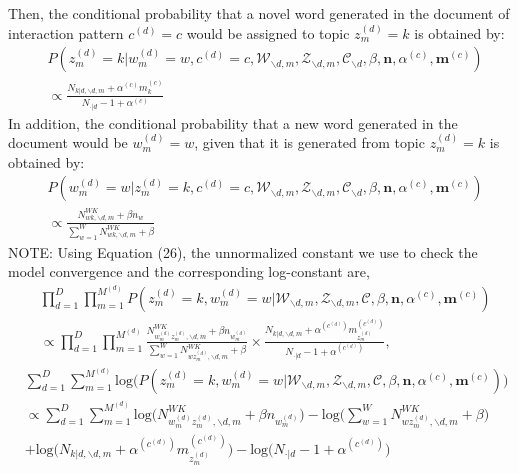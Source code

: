 \documentclass[a4paper]{article}
\begin{document}
  Then, the conditional probability that a novel word generated in the document of interaction pattern $c^{(d)}=c$  would be assigned to topic $z_m^{(d)}=k$ is obtained by:
  \begin{equation}
  \begin{aligned}
  &P(z^{(d)}_m=k|w^{(d)}_m=w, c^{(d)}=c, \mathcal{W}_{\backslash d, m}, \mathcal{Z}_{\backslash d,m}, \mathcal{C}_{\backslash d}, \beta, \boldsymbol{n}, \alpha^{(c)}, \boldsymbol{m}^{(c)}) \\& \propto
  \frac{N_{k|d, \backslash d, m}+\alpha^{(c)} m^{(c)}_k}{N_{\cdot|d}-1+\alpha^{(c)}}
  \end{aligned}
  \end{equation}
  In addition, the conditional probability that a new word generated in the document would be $w_m^{(d)}=w$, given that it is generated from topic $z_m^{(d)}=k$ is obtained by:
  \begin{equation}
  \begin{aligned}
  & P(w^{(d)}_m=w|z^{(d)}_m=k, c^{(d)}=c, \mathcal{W}_{\backslash d, m}, \mathcal{Z}_{\backslash d,m}, \mathcal{C}_{\backslash d}, \beta, \boldsymbol{n}, \alpha^{(c)}, \boldsymbol{m}^{(c)}) \\& \propto 
  \frac{N_{wk, \backslash d, m}^{WK}+\beta n_w}{\sum_{w=1}^WN_{wk, \backslash d, m}^{WK}+\beta}
  \end{aligned} 
  \end{equation}
  NOTE: Using Equation (26), the unnormalized constant we use to check the model convergence and the corresponding log-constant are,
  \begin{equation}
  \begin{aligned}
  & \prod_{d=1}^{D}\prod_{m=1}^{M^{(d)}}  P(z^{(d)}_m=k, w^{(d)}_m=w|\mathcal{W}_{\backslash d, m}, \mathcal{Z}_{\backslash d,m}, \mathcal{C}, \beta, \boldsymbol{n}, \alpha^{(c)}, \boldsymbol{m}^{(c)}) \\ & \propto \prod_{d=1}^{D}\prod_{m=1}^{M^{(d)}} 
  \frac{N_{w^{(d)}_mz^{(d)}_m, \backslash d, m}^{WK}+\beta n_ {w^{(d)}_m}}{\sum_{w=1}^WN_{wz^{(d)}_m,  \backslash d, m}^{WK}+\beta}\times\frac{N_{k|d, \backslash d, m}+\alpha^{(c^{(d)})} m^{(c^{(d)})}_{z^{(d)}_m}}{N_{\cdot|d}-1+\alpha^{(c^{(d)})}},
  \end{aligned}
  \end{equation}
  \begin{equation}
  \begin{aligned}
  & \sum_{d=1}^{D}\sum_{m=1}^{M^{(d)}} \mbox{log}\Big( P(z^{(d)}_m=k, w^{(d)}_m=w|\mathcal{W}_{\backslash d, m}, \mathcal{Z}_{\backslash d,m}, \mathcal{C}, \beta, \boldsymbol{n}, \alpha^{(c)}, \boldsymbol{m}^{(c)})\Big) \\ & \propto \sum_{d=1}^{D}\sum_{m=1}^{M^{(d)}} 
  \mbox{log}\Big(N_{w^{(d)}_mz^{(d)}_m, \backslash d, m}^{WK}+\beta n_ {w^{(d)}_m}\Big)-\mbox{log}\Big(\sum_{w=1}^WN_{wz^{(d)}_m,  \backslash d, m}^{WK}+\beta\Big)\\&+\mbox{log}\Big(N_{k|d, \backslash d, m}+\alpha^{(c^{(d)})} m^{(c^{(d)})}_{z^{(d)}_m}\Big)-\mbox{log}\Big(N_{\cdot|d}-1+\alpha^{(c^{(d)})}\Big)
  \end{aligned}
  \end{equation}
  	\clearpage


\end{document}
